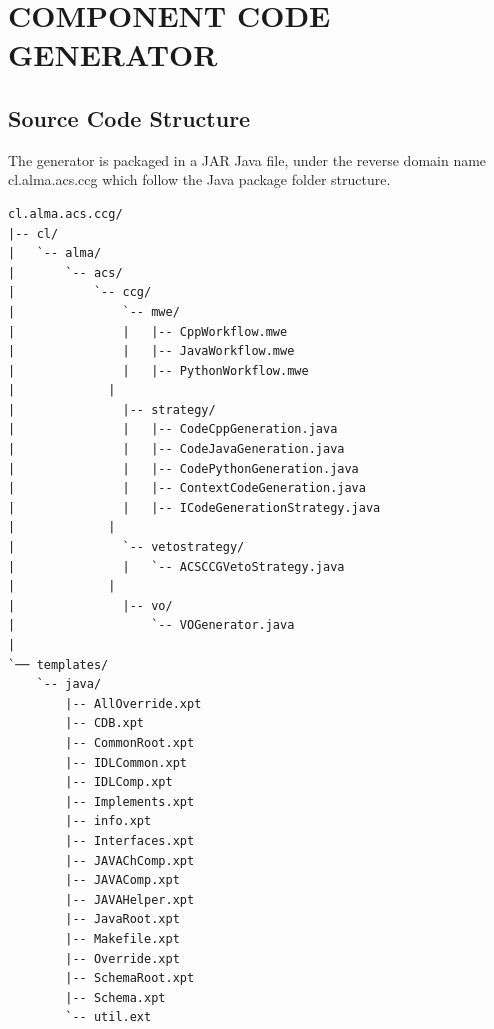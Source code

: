 \section{COMPONENT CODE GENERATOR}

\subsection{Source Code Structure}
The generator is packaged in a JAR Java file, under the reverse domain name
cl.alma.acs.ccg which follow the Java package folder structure.

\begin{verbatim}
cl.alma.acs.ccg/
|-- cl/
|   `-- alma/
|       `-- acs/
|           `-- ccg/
|               `-- mwe/
|               |   |-- CppWorkflow.mwe
|               |   |-- JavaWorkflow.mwe
|               |   |-- PythonWorkflow.mwe
|             |   
|               |-- strategy/
|               |   |-- CodeCppGeneration.java
|               |   |-- CodeJavaGeneration.java
|               |   |-- CodePythonGeneration.java
|               |   |-- ContextCodeGeneration.java
|               |   |-- ICodeGenerationStrategy.java
|             |   
|               `-- vetostrategy/
|               |   `-- ACSCCGVetoStrategy.java
|             |     
|               |-- vo/
|                   `-- VOGenerator.java
|
`── templates/
    `-- java/
        |-- AllOverride.xpt
        |-- CDB.xpt
        |-- CommonRoot.xpt
        |-- IDLCommon.xpt
        |-- IDLComp.xpt
        |-- Implements.xpt
        |-- info.xpt
        |-- Interfaces.xpt
        |-- JAVAChComp.xpt
        |-- JAVAComp.xpt
        |-- JAVAHelper.xpt
        |-- JavaRoot.xpt
        |-- Makefile.xpt
        |-- Override.xpt
        |-- SchemaRoot.xpt
        |-- Schema.xpt
        `-- util.ext
\end{verbatim}

